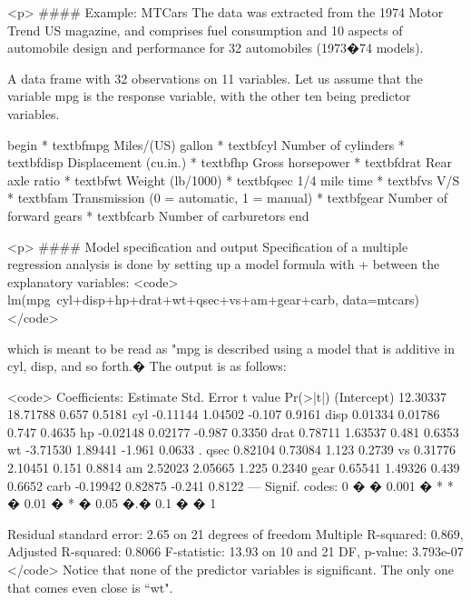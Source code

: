 
<p>
#### {Example: MTCars}
The data was extracted from the 1974 Motor Trend US magazine, and comprises fuel consumption and 10 aspects of automobile design and performance for 32 automobiles (1973�74 models).

A data frame with 32 observations on 11 variables. Let
us assume that the variable mpg is the response variable, with the other ten being predictor variables.

begin{ }
          * textbf{mpg}  Miles/(US) gallon
          * textbf{cyl}  Number of cylinders
          * textbf{disp}  Displacement (cu.in.)
          * textbf{hp}  Gross horsepower
          * textbf{drat}  Rear axle ratio
          * textbf{wt}  Weight (lb/1000)
          * textbf{qsec}  1/4 mile time
          * textbf{vs}  V/S
          * textbf{am}  Transmission (0 = automatic, 1 = manual)
          * textbf{gear}  Number of forward gears
          * textbf{carb}  Number of carburetors
end{ }

<p>
#### {Model specification and output}
Specification of a multiple regression analysis is done by setting up a
model formula with + between the explanatory variables:
<code>
lm(mpg~cyl+disp+hp+drat+wt+qsec+vs+am+gear+carb, data=mtcars)
</code>

which is meant to be read as "mpg is described using a model that
is additive in cyl, disp, and so forth.� The output is as follows:

<code>
Coefficients:
            Estimate Std. Error t value Pr(>|t|)
(Intercept) 12.30337   18.71788   0.657   0.5181
cyl         -0.11144    1.04502  -0.107   0.9161
disp         0.01334    0.01786   0.747   0.4635
hp          -0.02148    0.02177  -0.987   0.3350
drat         0.78711    1.63537   0.481   0.6353
wt          -3.71530    1.89441  -1.961   0.0633 .
qsec         0.82104    0.73084   1.123   0.2739
vs           0.31776    2.10451   0.151   0.8814
am           2.52023    2.05665   1.225   0.2340
gear         0.65541    1.49326   0.439   0.6652
carb        -0.19942    0.82875  -0.241   0.8122
---
Signif. codes:  0 �                   � 0.001 �             *  * � 0.01 �       * � 0.05 �.� 0.1 � � 1

Residual standard error: 2.65 on 21 degrees of freedom
Multiple R-squared: 0.869,      Adjusted R-squared: 0.8066
F-statistic: 13.93 on 10 and 21 DF,  p-value: 3.793e-07
</code>
Notice that none of the predictor variables is significant. The only one that comes even close is ``wt".

